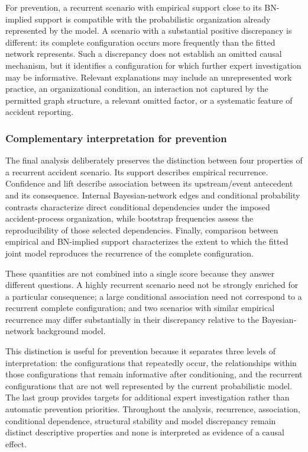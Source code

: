 For prevention, a recurrent scenario with empirical support close to its
BN-implied support is compatible with the probabilistic organization already
represented by the model. A scenario with a substantial positive discrepancy
is different: its complete configuration occurs more frequently than the
fitted network represents. Such a discrepancy does not establish an omitted
causal mechanism, but it identifies a configuration for which further expert
investigation may be informative. Relevant explanations may include an
unrepresented work practice, an organizational condition, an interaction not
captured by the permitted graph structure, a relevant omitted factor, or a
systematic feature of accident reporting.


\subsubsection{Complementary interpretation for prevention}
\label{sec:chap4_scenario_interpretation}

The final analysis deliberately preserves the distinction between four
properties of a recurrent accident scenario. Its support describes empirical
recurrence. Confidence and lift describe association between its
upstream/event antecedent and its consequence. Internal Bayesian-network
edges and conditional probability contrasts characterize direct conditional
dependencies under the imposed accident-process organization, while bootstrap
frequencies assess the reproducibility of those selected dependencies.
Finally, comparison between empirical and BN-implied support characterizes
the extent to which the fitted joint model reproduces the recurrence of the
complete configuration.

These quantities are not combined into a single score because they answer
different questions. A highly recurrent scenario need not be strongly
enriched for a particular consequence; a large conditional association need
not correspond to a recurrent complete configuration; and two scenarios with
similar empirical recurrence may differ substantially in their discrepancy
relative to the Bayesian-network background model.

This distinction is useful for prevention because it separates three levels
of interpretation: the configurations that repeatedly occur, the
relationships within those configurations that remain informative after
conditioning, and the recurrent configurations that are not well represented
by the current probabilistic model. The last group provides targets for
additional expert investigation rather than automatic prevention priorities.
Throughout the analysis, recurrence, association, conditional dependence,
structural stability and model discrepancy remain distinct descriptive
properties and none is interpreted as evidence of a causal effect.
